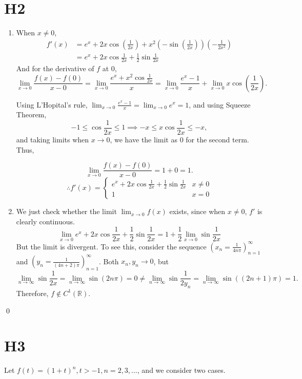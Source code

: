 \documentclass{article}
\theoremstyle{plain}
\newcommand{\R}{\mathbb{R}}
\begin{document}
\section*{H2}
\begin{enumerate}
  \item When $x\neq0$,
        \begin{align*}
          f'(x)&=e^{x}+2x\cos(\frac{1}{2x})+x^{2}(-\sin(\frac{1}{2x}))(-\frac{1}{2x^{2}})\\
               &=e^{x}+2x\cos\frac{1}{2x}+\frac{1}{2}\sin\frac{1}{2x}
        \end{align*}
        And for the derivative of $f$ at 0,
        \[\lim_{x\to0}{\frac{f(x)-f(0)}{x-0}}
        =\lim_{x\to0}\frac{e^{x}+x^{2}\cos\frac{1}{2x}}{x}
        =\lim_{x\to0}\frac{e^{x}-1}{x} + \lim_{x\to0}x\cos(\frac{1}{2x}).
        \]

        Using L'Hopital's rule, $\lim_{x\to0}\frac{e^{x}-1}{x}=\lim_{x\to0}e^{x}=1$,
        and using Squeeze Theorem,
        \[ -1\leq\cos\frac{1}{2x}\leq1\implies -x\leq x\cos\frac{1}{2x}\leq-x,\] and taking
        limits when $x\to0$, we have the limit as $0$ for the second term. Thus,

        \[\lim_{x\to0}{\frac{f(x)-f(0)}{x-0}}=1+0=1.\]
        \[\therefore f'(x)=\begin{cases}
            e^{x}+2x\cos\frac{1}{2x}+\frac{1}{2}\sin\frac{1}{2x} & x\neq0\\
            1 & x=0
          \end{cases}\]

  \item We just check whether the limit $\lim_{x\to0}f(x)$ exists, since when
        $x\neq0$, $f'$ is clearly continuous.
        \[\lim_{x\to0} e^{x}+2x\cos\frac{1}{2x}+\frac{1}{2}\sin\frac{1}{2x}
        = 1 + \frac{1}{2}\lim_{x\to0}\sin\frac{1}{2x} \]
        But the limit is divergent. To see this, consider the sequence
        $(x_{n}=\frac{1}{4n\pi})_{n=1}^{\infty}$ and
        $(y_{n}=\frac{1}{(4n+2)\pi})_{n=1}^{\infty}$. Both $x_{n},y_{n}\to0$, but
        \[\lim_{n\to\infty}\sin\frac{1}{2x}=\lim_{n\to\infty}\sin(2n\pi)=0\neq\lim_{n\to\infty}\sin\frac{1}{2y_{n}}=
        \lim_{n\to\infty}\sin((2n+1)\pi)=1.\] Therefore, $f\notin C^{1}(\R).$
\end{enumerate}\qed


\section*{H3}
Let $f(t)=(1+t)^{n}, t>-1, n=2,3,\ldots$, and we consider two cases.
\end{document}
